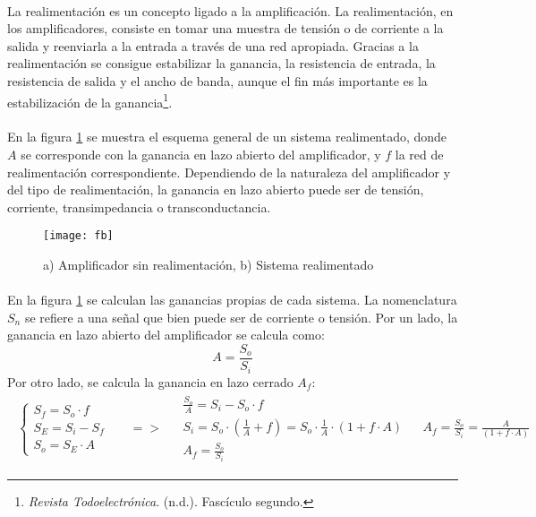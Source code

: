 \paragraph{}
La realimentación es un concepto ligado a la amplificación.
La realimentación, en los amplificadores, consiste en tomar una muestra de tensión o de corriente a la salida y reenviarla a la entrada a través de una red apropiada.
Gracias a la realimentación se consigue estabilizar la ganancia, la resistencia de entrada, la resistencia de salida y el ancho de banda, aunque el fin más importante es la estabilización de la ganancia\footnote{\textit{Revista Todoelectrónica}. (n.d.). Fascículo segundo.}.
\paragraph{}
En la figura \ref{fig:fb} se muestra el esquema general de un sistema realimentado, donde $A$ se corresponde con la ganancia en lazo abierto del amplificador, y $f$ la red de realimentaci\'on correspondiente. Dependiendo de la naturaleza del amplificador y del tipo de realimentación, la ganancia en lazo abierto puede ser de tensión, corriente, transimpedancia o transconductancia.
\begin{figure}[h]
    \centering
    \texttt{[image: fb]}
    \caption{a) Amplificador sin realimentaci\'on, b) Sistema realimentado} 
    \label{fig:fb}
\end{figure}
\paragraph{}
En la figura \ref{fig:fb} se calculan las ganancias propias de cada sistema. La nomenclatura $S_n$ se refiere a una señal que bien puede ser de corriente o tensión.
Por un lado, la ganancia en lazo abierto del amplificador se calcula como:
$$A = \frac{S_o}{S_i} $$
Por otro lado, se calcula la ganancia en lazo cerrado $A_f$:
\[
\begin{array}{rccl} 
      \begin{array}{l}
	 \begin{cases}
	    S_f = S_o \cdot f \\
	    S_E = S_i - S_f \\
	    S_o = S_E \cdot A
	 \end{cases}
      \end{array}
      &
      \begin{array}{l}
	  =>
      \end{array}
      &
      \begin{array}{l}
	 \frac{S_o}{A} = S_i - S_o \cdot f \\
	 S_i = S_o \cdot \left(\frac{1}{A} + f \right) = S_o \cdot \frac{1}{A} \cdot (1 + f \cdot A) \\
	 A_f = \frac{S_o}{S_i}
      \end{array}
      &
      \begin{array}{l}
	 A_f = \frac{S_o}{S_i} = \frac{A}{(1 + f \cdot A)} 
      \end{array}
\end{array}
\]
